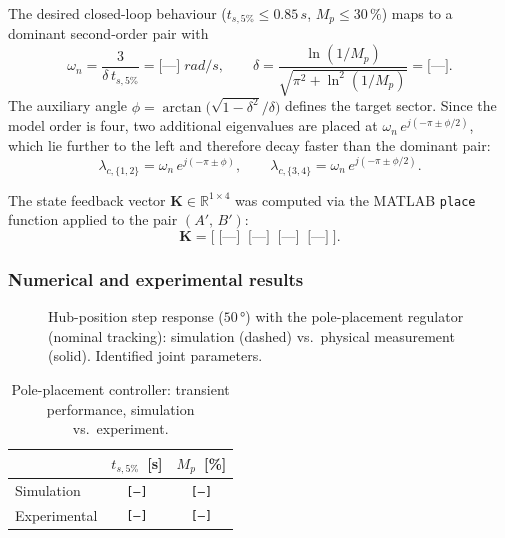 \documentclass[11pt]{article}
\DeclareRobustCommand{\vect}[1]{ \boldsymbol{#1} }
\newcommand{\wn}{\omega_n}
\begin{document}
The desired closed-loop behaviour ($t_{s,5\%} \le 0.85\,\si{s}$, $M_p \le 30\,\%$)
maps to a dominant second-order pair with
\begin{equation}
    \wn = \frac{3}{\delta\,t_{s,5\%}} = \texttt{[---]}\;\si{rad/s},\qquad
    \delta = \frac{\ln(1/M_p)}{\sqrt{\pi^2 + \ln^2(1/M_p)}} = \texttt{[---]}.
    \label{eq:wn_delta}
\end{equation}
The auxiliary angle $\phi = \arctan\!\bigl(\sqrt{1-\delta^2}/\delta\bigr)$ defines the
target sector.  Since the model order is four, two additional eigenvalues are placed at
$\omega_n\,e^{j(-\pi\pm\phi/2)}$, which lie further to the left and therefore decay faster
than the dominant pair:
\begin{equation}
    \lambda_{c,\{1,2\}} = \wn\,e^{j(-\pi\pm\phi)},\qquad
    \lambda_{c,\{3,4\}} = \wn\,e^{j(-\pi\pm\phi/2)}.
    \label{eq:eigenvalues}
\end{equation}

The state feedback vector $\vect{K}\in\mathbb{R}^{1\times4}$ was computed via the MATLAB
\texttt{place} function applied to the pair $(A',\,B')$:
\begin{equation}
    \vect{K} = \bigl[\;\texttt{[---]}\;\;\texttt{[---]}\;\;\texttt{[---]}\;\;\texttt{[---]}\;\bigr].
\end{equation}

\subsubsection*{Numerical and experimental results}

\begin{figure}[H]
    \centering
    \caption{Hub-position step response ($50\,\si{\degree}$) with the pole-placement
             regulator (nominal tracking): simulation (dashed) vs.\ physical measurement
             (solid).  Identified joint parameters.}
    \label{fig:ss_eigen_50}
\end{figure}

\begin{table}[H]
\centering
\caption{Pole-placement controller: transient performance, simulation vs.\ experiment.}
\label{tab:ss_eigen_perf}
\begin{tabular}{lcc}
\toprule
& $t_{s,5\%}$~[s] & $M_p$~[\%] \\
\midrule
Simulation   & \texttt{[---]} & \texttt{[---]} \\
Experimental & \texttt{[---]} & \texttt{[---]} \\
\bottomrule
\end{tabular}
\end{table}
\end{document}
